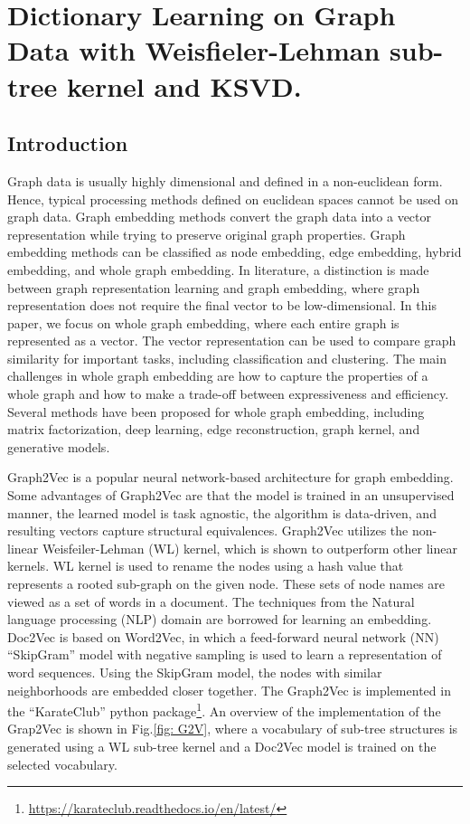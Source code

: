\chapter{Dictionary Learning on Graph Data with Weisfieler-Lehman sub-tree kernel and KSVD.}\label{ch:graph_sparse}

\section{Introduction}\label{intro}
Graph data is usually highly dimensional and defined in a non-euclidean form. Hence, typical processing methods defined on euclidean spaces cannot be used on graph data. Graph embedding methods convert the graph data into a vector representation while trying to preserve original graph properties\cite{Cai2018}.%
Graph embedding methods can be classified as node embedding, edge embedding, hybrid embedding, and whole graph embedding. In literature, a distinction is made between graph representation learning and graph embedding\cite{Cai2018, Chami2022}, where graph representation does not require the final vector to be low-dimensional. In this paper, we focus on whole graph embedding, where each entire graph is represented as a vector\cite{Maddalena2021}. The vector representation can be used to compare graph similarity for important tasks, including classification and clustering. The main challenges in whole graph embedding are how to capture the properties of a whole graph and how to make a trade-off between expressiveness and efficiency\cite{Cai2018}. Several methods have been proposed for whole graph embedding, including matrix factorization, deep learning, edge reconstruction, graph kernel, and generative models\cite{Cai2018, Maddalena2021}.

Graph2Vec is a popular neural network-based architecture for graph embedding\cite{Narayanan2017}. Some advantages of Graph2Vec are that the model is trained in an unsupervised manner, the learned model is task agnostic, the algorithm is data-driven, and resulting vectors capture structural equivalences. Graph2Vec utilizes the non-linear Weisfeiler-Lehman (WL) kernel\cite{weisfeiler1968reduction},
which is shown to outperform other linear kernels\cite{shervashidze2011weisfeiler, Yanardag2015}. WL kernel is used to rename the nodes using a hash value that represents a rooted sub-graph on the given node. These sets of node names are viewed as a set of words in a document. The techniques from the Natural language processing (NLP) domain are borrowed for learning an embedding. Doc2Vec is based on Word2Vec\cite{Mikolov2013}, in which a feed-forward neural network (NN) ``SkipGram'' model with negative sampling is used to learn a representation of word sequences\cite{Le2014}. Using the SkipGram model, the nodes with similar neighborhoods are embedded closer together\cite{Rong2014}. The Graph2Vec is implemented in the ``KarateClub'' python package\cite{Karateclub}\footnote{\url{https://karateclub.readthedocs.io/en/latest/}}. An overview of the implementation of the Grap2Vec is shown in Fig.\ref{fig: G2V}, where a vocabulary of sub-tree structures is generated using a WL sub-tree kernel and a Doc2Vec model is trained on the selected vocabulary. 


